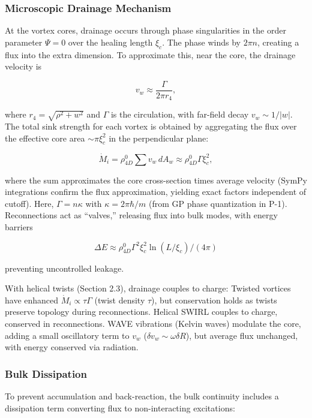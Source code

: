 \subsubsection{Microscopic Drainage Mechanism}
At the vortex cores, drainage occurs through phase singularities in the order parameter $\Psi=0$ over the healing length $\xi_c$. The phase winds by $2\pi n$, creating a flux into the extra dimension. To approximate this, near the core, the drainage velocity is

\begin{equation}
v_w \approx \frac{\Gamma}{2\pi r_4},
\end{equation}

where $r_4 = \sqrt{\rho^2 + w^2}$ and $\Gamma$ is the circulation, with far-field decay $v_w \sim 1/|w|$. The total sink strength for each vortex is obtained by aggregating the flux over the effective core area $\sim \pi \xi_c^2$ in the perpendicular plane:

\begin{equation}
\dot{M}_i = \rho_{4D}^0 \sum v_w \, dA_w \approx \rho_{4D}^0 \Gamma \xi_c^2,
\end{equation}

where the sum approximates the core cross-section times average velocity (SymPy integrations confirm the flux approximation, yielding exact factors independent of cutoff). Here, $\Gamma = n \kappa$ with $\kappa = 2 \pi \hbar / m$ (from GP phase quantization in P-1). Reconnections act as ``valves,'' releasing flux into bulk modes, with energy barriers

\begin{equation}
\Delta E \approx \rho_{4D}^0 \Gamma^2 \xi_c^2 \ln(L / \xi_c) / (4\pi)
\end{equation}

preventing uncontrolled leakage.

With helical twists (Section 2.3), drainage couples to charge: Twisted vortices have enhanced $\dot{M}_i \propto \tau \Gamma$ (twist density $\tau$), but conservation holds as twists preserve topology during reconnections. Helical SWIRL couples to charge, conserved in reconnections. WAVE vibrations (Kelvin waves) modulate the core, adding a small oscillatory term to $v_w$ ($\delta v_w \sim \omega \delta R$), but average flux unchanged, with energy conserved via radiation.

\subsubsection{Bulk Dissipation}
To prevent accumulation and back-reaction, the bulk continuity includes a dissipation term converting flux to non-interacting excitations:

